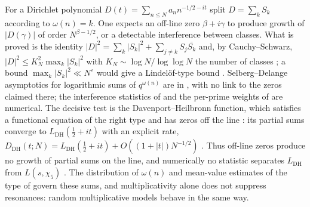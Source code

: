 \documentclass[11pt]{amsart}
\theoremstyle{definition}
\theoremstyle{remark}
\numberwithin{equation}{section}
\begin{document}
For a Dirichlet polynomial $D(t)=\sum_{n\le N}a_nn^{-1/2-it}$ split $D=\sum_kS_k$ according to
$\omega(n)=k$. One expects an off-line zero $\beta+i\gamma$ to produce growth of $|D(\gamma)|$ of
order $N^{\beta-1/2}$, or a detectable interference between classes. What is proved is the identity
$|D|^2=\sum_k|S_k|^2+\sum_{j\ne k}S_j\overline{S_k}$ and, by Cauchy--Schwarz,
$|D|^2\le K_N^2\max_k|S_k|^2$ with $K_N\sim\log N/\log\log N$ the number of classes
\cite[Theorems~3.1, 4.1 and 5.1]{P02}; a bound $\max_k|S_k|^2\ll N^{\varepsilon}$ would give a
Lindel\"of-type bound \cite[Corollary~4.2]{P02}. Selberg--Delange asymptotics for logarithmic sums
of $q^{\omega(n)}$ are in \cite[Proposition~3.1]{P21}, with no link to the zeros claimed there;
the interference statistics of \cite{P03} and the per-prime weights of \cite{P05} are numerical.
The decisive test is the Davenport--Heilbronn function, which satisfies a functional equation of
the right type and has zeros off the line \cite{DavenportHeilbronn1936}: its partial sums converge
to $L_{\mathrm{DH}}(\frac12+it)$ with an explicit rate,
$D_{\mathrm{DH}}(t;N)=L_{\mathrm{DH}}(\frac12+it)+O((1+|t|)N^{-1/2})$ \cite[Proposition~2.3]{P04}.
Thus off-line zeros produce no growth of partial sums on the line, and numerically no statistic
separates $L_{\mathrm{DH}}$ from $L(s,\chi_5)$ \cite{P04}. The distribution of $\omega(n)$
\cite{ErdosKac1940} and mean-value estimates of the type of \cite{MontgomeryVaughan1974} govern
these sums, and multiplicativity alone does not suppress resonances: random multiplicative models
behave in the same way.
\end{document}

